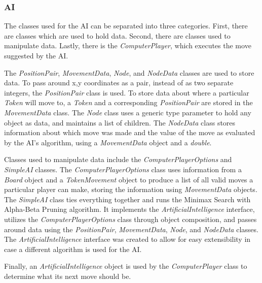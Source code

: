 \documentclass{article}
\begin{document}
\subsubsection{AI}
	The classes used for the AI can be separated into three categories. First, there are classes which are used to hold data. Second, there are classes used to manipulate data. Lastly, there is the \textit{ComputerPlayer}, which executes the move suggested by the AI.  \par
	The \textit{PositionPair}, \textit{MovementData}, \textit{Node}, and \textit{NodeData} classes are used to store data. To pass around x,y coordinates as a pair, instead of as two separate integers, the \textit{PositionPair} class is used. To store data about where a particular \textit{Token} will move to, a \textit{Token} and a corresponding \textit{PositionPair} are stored in the \textit{MovementData} class. The \textit{Node} class uses a generic type parameter to hold any object as data, and maintains a list of children. The \textit{NodeData} class stores information about which move was made and the value of the move as evaluated by the AI's algorithm, using a \textit{MovementData} object and a \textit{double}.\par
	Classes used to manipulate data include the \textit{ComputerPlayerOptions} and \textit{SimpleAI} classes. The \textit{ComputerPlayerOptions} class uses information from a \textit{Board} object and a \textit{TokenMovement} object to produce a list of all valid moves a particular player can make, storing the information using \textit{MovementData} objects. The \textit{SimpleAI} class ties everything together and runs the Minimax Search with Alpha-Beta Pruning algorithm. It implements the \textit{ArtificialIntelligence} interface, utilizes the \textit{ComputerPlayerOptions} class through object composition, and passes around data using the \textit{PositionPair}, \textit{MovementData}, \textit{Node}, and \textit{NodeData} classes. The \textit{ArtificialIntelligence} interface was created to allow for easy extensibility in case a different algorithm is used for the AI.\par
	Finally, an \textit{ArtificialIntelligence} object is used by the \textit{ComputerPlayer} class to determine what its next move should be. 
\end{document}
